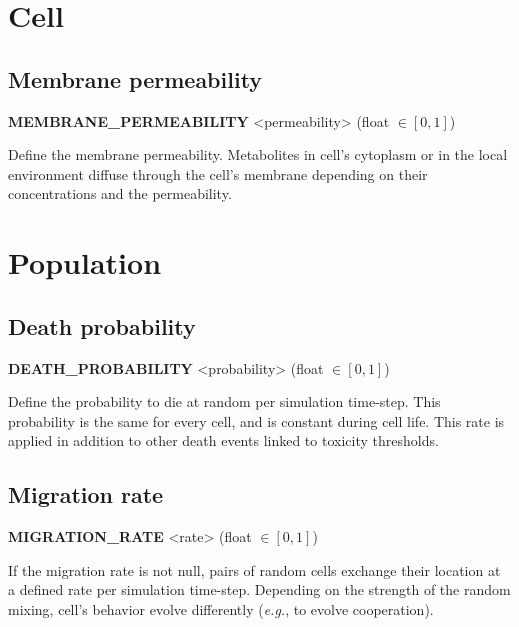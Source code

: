 
\section{Cell}

\subsection{Membrane permeability}
\begin{center}
{\bf MEMBRANE\_PERMEABILITY} <permeability> (float $\in [0, 1]$)
\end{center}
Define the membrane permeability. Metabolites in cell's cytoplasm or in the local environment diffuse through the cell's membrane depending on their concentrations and the permeability.


\section{Population}

\subsection{Death probability}
\begin{center}
{\bf DEATH\_PROBABILITY} <probability> (float $\in [0, 1]$)
\end{center}
Define the probability to die at random per simulation time-step. This probability is the same for every cell, and is constant during cell life. This rate is applied in addition to other death events linked to toxicity thresholds.


\subsection{Migration rate}
\begin{center}
{\bf MIGRATION\_RATE} <rate> (float $\in [0, 1]$)
\end{center}
If the migration rate is not null, pairs of random cells exchange their location at a defined rate per simulation time-step. Depending on the strength of the random mixing, cell's behavior evolve differently (\textit{e.g.}, to evolve cooperation).


